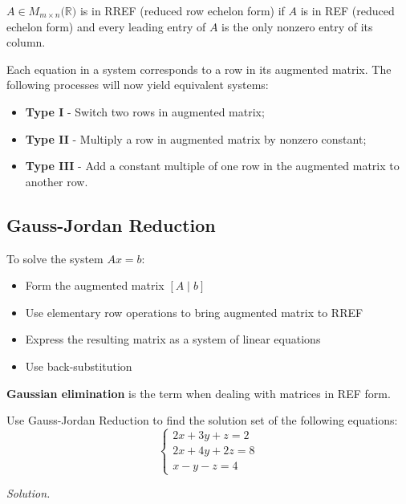 \begin{remark}
$A \in M_{m \times n}(\mathbb{R)}$ is in RREF (reduced row echelon form) if $A$ is in REF (reduced echelon form) and every leading entry of $A$ is the only nonzero entry of its column.
\end{remark}

\newpage
\begin{remark}
Each equation in a system corresponds to a row in its augmented matrix. The following processes will now yield equivalent systems:
\begin{itemize}
    \item \textbf{Type I} - Switch two rows in augmented matrix;
    \item \textbf{Type II} - Multiply a row in augmented matrix by nonzero constant;
    \item \textbf{Type III} - Add a constant multiple of one row in the augmented matrix to another row.
\end{itemize}
\end{remark}

\subsection{Gauss-Jordan Reduction}
To solve the system $Ax = b$:
\begin{itemize}
    \item Form the augmented matrix $[A \mid b]$
    \item Use elementary row operations to bring augmented matrix to RREF
    \item Express the resulting matrix as a system of linear equations
    \item Use back-substitution
\end{itemize}

\begin{remark}
\textbf{Gaussian elimination} is the term when dealing with matrices in REF form.
\end{remark}

\begin{example}
Use Gauss-Jordan Reduction to find the solution set of the following equations:
$$\begin{cases}
    2x + 3y + z = 2 \\
    2x + 4y + 2z = 8 \\
    x - y - z = 4
\end{cases}$$
\end{example}

\textit{Solution.} 

